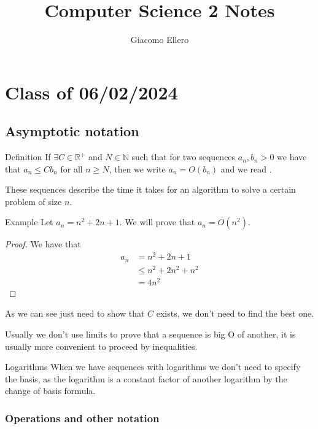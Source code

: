 \documentclass[10pt]{extarticle}
\title{Computer Science 2 Notes}
\author{Giacomo Ellero}
\newcommand{\R}{\mathbb{R}}
\newcommand{\N}{\mathbb{N}}
\begin{document}
\maketitle
\tableofcontents
\clearpage

\section{Class of 06/02/2024}

\subsection{Asymptotic notation}

\begin{bluebox}{Definition}
    If $\exists C \in \R^+$ and $N \in \N$ such that for two sequences $a_n, b_n > 0$
    we have that $a_n \leq Cb_n$ for all $n \geq N$, then we write $a_n = O(b_n)$ and we read .
\end{bluebox}

These sequences describe the time it takes for an algorithm to solve a certain problem of size $n$.

\begin{examplebox}{Example}
    Let $a_n = n^2 + 2n + 1$. We will prove that $a_n = O(n^2)$.

    \begin{proof}
        We have that
        \begin{align*}
            a_n & = n^2 + 2n + 1        \\
                & \leq n^2 + 2n^2 + n^2 \\
                & = 4n^2
        \end{align*}
    \end{proof}

    As we can see just need to show that $C$ exists, we don't need to find the best one.
\end{examplebox}

Usually we don't use limits to prove that a sequence is big O of another, it is usually more convenient to proceed by inequalities.

\begin{notebox}{Logarithms}
    When we have sequences with logarithms we don't need to specify the basis,
    as the logarithm is a constant factor of another logarithm by the change of basis formula.
\end{notebox}

\subsubsection{Operations and other notation}
\end{document}
